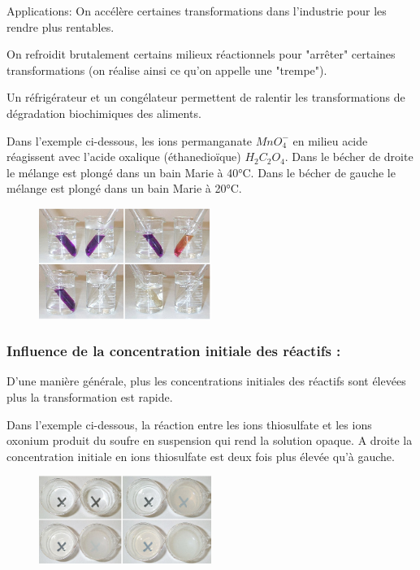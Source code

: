 \documentclass[12pt]{article}
\begin{document}
Applications:	On accélère certaines transformations dans l'industrie pour les rendre plus rentables.

On refroidit brutalement certains milieux réactionnels pour "arrêter" certaines transformations (on réalise ainsi ce qu'on appelle une "trempe").

Un réfrigérateur et un congélateur permettent de ralentir les transformations de dégradation biochimiques des aliments.

Dans l'exemple ci-dessous, les ions permanganate $MnO_4^-$ en milieu acide réagissent avec l'acide oxalique 
 (éthanedioïque) $H_2C_2O_4$. Dans le bécher de droite le mélange est plongé dans un bain Marie à 40°C. Dans le bécher de gauche le mélange est plongé dans un bain Marie à 20°C.
\begin{figure}[h!]
	\begin{center}
	\includegraphics[width=0.5\textwidth]{./img/TRLtemperatureFact.png}
\end{center}
\vspace{-1cm}
\end{figure}

\subsubsection{Influence de la concentration initiale des réactifs :}
D'une manière générale, plus les concentrations initiales des réactifs sont élevées plus la transformation est rapide.

Dans l'exemple ci-dessous, la réaction entre les ions thiosulfate et les ions oxonium produit du soufre en suspension qui rend la solution opaque. A droite la concentration initiale en ions thiosulfate est deux fois plus élevée qu'à gauche.
\begin{figure}[h!]
	\begin{center}
	\includegraphics[width=0.5\textwidth]{./img/TRLconcentration.png}
\end{center}
\vspace{-1cm}
\end{figure}
\end{document}

